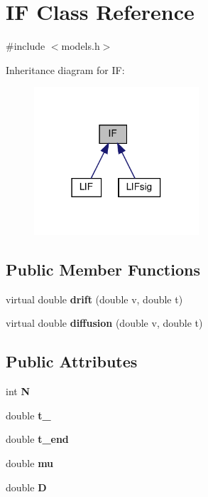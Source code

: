 \hypertarget{classIF}{}\section{IF Class Reference}
\label{classIF}


{\ttfamily \#include $<$models.\+h$>$}



Inheritance diagram for IF\+:\nopagebreak
\begin{figure}[H]
\begin{center}
\leavevmode
\includegraphics[width=174pt]{classIF__inherit__graph}
\end{center}
\end{figure}
\subsection*{Public Member Functions}
\begin{DoxyCompactItemize}
\item 
\mbox{\label{classIF_a9bbd53df68cb9028bf87cf5273253e91}} 
virtual double {\bfseries drift} (double v, double t)
\item 
\mbox{\label{classIF_a45c14ff90b19a93769c2c30741cd482d}} 
virtual double {\bfseries diffusion} (double v, double t)
\end{DoxyCompactItemize}
\subsection*{Public Attributes}
\begin{DoxyCompactItemize}
\item 
\mbox{\label{classIF_aa81bddacf949214f2265214d7174f4c2}} 
int {\bfseries N}
\item 
\mbox{\label{classIF_ab9ff14c2b3690db446567d26cdf21540}} 
double {\bfseries t\+\_}
\item 
\mbox{\label{classIF_a2c512964adfc0421306b655ba3c85d3d}} 
double {\bfseries t\+\_\+end}
\item 
\mbox{\label{classIF_a9f690c993d7b7cd0095e26607503db72}} 
double {\bfseries mu}
\item 
\mbox{\label{classIF_a7e0fdbf32975dba0acf8096524885639}} 
double {\bfseries D}
\end{DoxyCompactItemize}


